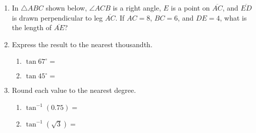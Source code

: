 \documentclass[12pt, twoside]{article}
\begin{document}
\begin{enumerate}
\item In $\triangle ABC$ shown below, $\angle ACB$ is a right angle, $E$ is a point on $\overline{AC}$, and $\overline{ED}$ is drawn perpendicular to leg $\overline{AC}$. If $AC = 8$, $BC = 6$, and $DE = 4$, what is the length of $\overline{AE}$? 
\begin{flushright}
\end{flushright} 

\newpage
\item Express the result to the nearest thousandth.  \vspace{.5cm}
    \begin{multicols}{2}
      \begin{enumerate}
        \item $\tan 67^\circ = $ \vspace{1cm}
        \item $\tan 45^\circ =$
      \end{enumerate}
    \end{multicols} \vspace{1cm}

\item Round each value to the nearest degree.  \vspace{.5cm}
    \begin{multicols}{2}
      \begin{enumerate}
        \item $\tan^{-1} (0.75) = $ \vspace{1cm}
        \item $\tan^{-1} (\sqrt{3}) =$
      \end{enumerate}
    \end{multicols} \vspace{1cm}


\end{enumerate}
\end{document}
